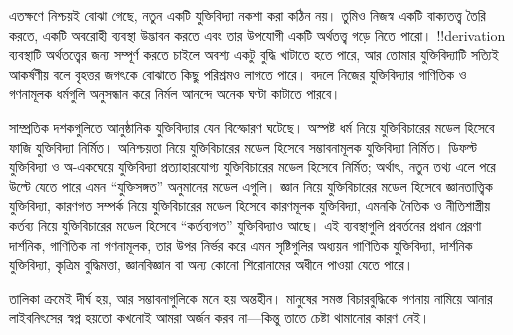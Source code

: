 \documentclass[../../../include/open-logic-section]{subfiles}
\begin{document}


এতক্ষণে নিশ্চয়ই বোঝা গেছে, নতুন একটি যুক্তিবিদ্যা নকশা করা কঠিন
নয়। তুমিও নিজস্ব একটি বাক্যতত্ত্ব তৈরি করতে, একটি অবরোহী ব্যবস্থা
উদ্ভাবন করতে এবং তার উপযোগী একটি অর্থতত্ত্ব গড়ে নিতে পারো।
!!{derivation} ব্যবস্থাটি অর্থতত্ত্বের জন্য সম্পূর্ণ করতে চাইলে অবশ্য
একটু বুদ্ধি খাটাতে হতে পারে, আর তোমার যুক্তিবিদ্যাটি সত্যিই আকর্ষণীয়
বলে বৃহত্তর জগৎকে বোঝাতে কিছু পরিশ্রমও লাগতে পারে। বদলে নিজের
যুক্তিবিদ্যার গাণিতিক ও গণনামূলক ধর্মগুলি অনুসন্ধান করে নির্মল আনন্দে
অনেক ঘণ্টা কাটাতে পারবে।

সাম্প্রতিক দশকগুলিতে আনুষ্ঠানিক যুক্তিবিদ্যার যেন বিস্ফোরণ ঘটেছে।
অস্পষ্ট ধর্ম নিয়ে যুক্তিবিচারের মডেল হিসেবে ফাজি যুক্তিবিদ্যা নির্মিত।
অনিশ্চয়তা নিয়ে যুক্তিবিচারের মডেল হিসেবে সম্ভাবনামূলক যুক্তিবিদ্যা
নির্মিত। ডিফল্ট যুক্তিবিদ্যা ও অ-একঘেয়ে যুক্তিবিদ্যা প্রত্যাহারযোগ্য
যুক্তিবিচারের মডেল হিসেবে নির্মিত; অর্থাৎ, নতুন তথ্য এলে পরে উল্টে যেতে
পারে এমন “যুক্তিসঙ্গত” অনুমানের মডেল এগুলি। জ্ঞান নিয়ে যুক্তিবিচারের
মডেল হিসেবে জ্ঞানতাত্ত্বিক যুক্তিবিদ্যা, কারণগত সম্পর্ক নিয়ে
যুক্তিবিচারের মডেল হিসেবে কারণমূলক যুক্তিবিদ্যা, এমনকি নৈতিক ও
নীতিশাস্ত্রীয় কর্তব্য নিয়ে যুক্তিবিচারের মডেল হিসেবে “কর্তব্যগত”
যুক্তিবিদ্যাও আছে। এই ব্যবস্থাগুলি প্রবর্তনের প্রধান প্রেরণা দার্শনিক,
গাণিতিক না গণনামূলক, তার উপর নির্ভর করে এমন সৃষ্টিগুলির অধ্যয়ন
গাণিতিক যুক্তিবিদ্যা, দার্শনিক যুক্তিবিদ্যা, কৃত্রিম বুদ্ধিমত্তা,
জ্ঞানবিজ্ঞান বা অন্য কোনো শিরোনামের অধীনে পাওয়া যেতে পারে।

তালিকা ক্রমেই দীর্ঘ হয়, আর সম্ভাবনাগুলিকে মনে হয় অন্তহীন। মানুষের
সমস্ত বিচারবুদ্ধিকে গণনায় নামিয়ে আনার লাইবনিৎসের স্বপ্ন হয়তো কখনোই
আমরা অর্জন করব না---কিন্তু তাতে চেষ্টা থামানোর কারণ নেই।
\end{document}
